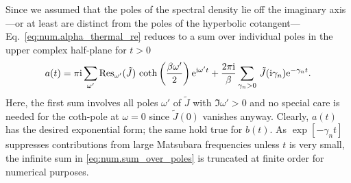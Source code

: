 
Since we assumed that the poles of the spectral density lie off the imaginary axis---or at least are distinct from the poles of the hyperbolic cotangent---Eq.~\ref{eq:num.alpha_thermal_re} reduces to a sum over individual poles in the upper complex half-plane for $t > 0$
\begin{equation}
  a(t) = \pi\ii \sum_{\omega'} \Res_{\omega'}(\tilde J) \, \coth \left(\frac{\beta \omega'}{2}\right) \exp[\ii\omega' t]
  + \frac{2\pi\ii}{\beta}\sum_{\gamma_n > 0}  \, \tilde J(\ii\gamma_n) \exp[-\gamma_n t].
  \label{eq:num.sum_over_poles}
\end{equation}
Here, the first sum involves all poles $\omega'$ of $\tilde J$ with $\Im \omega' > 0$ and no special care is needed for the coth-pole at $\omega = 0$ since $\tilde J(0)$ vanishes anyway.
Clearly, $a(t)$ has the desired exponential form; the same hold true for $b(t)$.
As $\exp[-\gamma_n t]$ suppresses contributions from large Matsubara frequencies unless $t$ is very small, the infinite sum in \autoref{eq:num.sum_over_poles} is truncated at finite order for numerical purposes.

